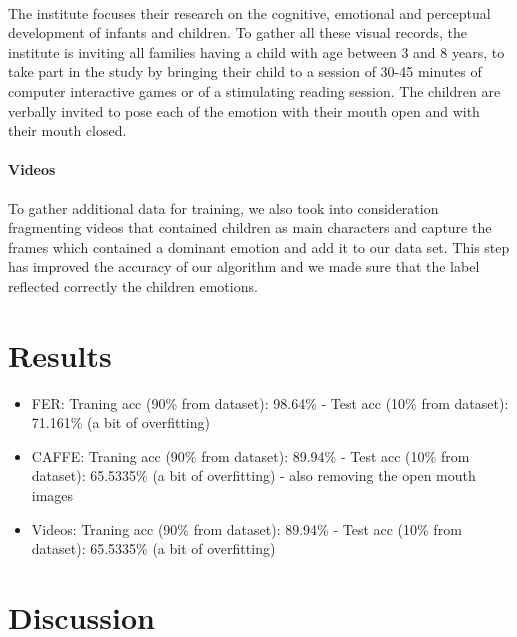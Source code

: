 \documentclass[runningheads,a4paper,11pt]{report}
\begin{document}
\paragraph{}
The institute focuses their research on the cognitive, emotional and perceptual development of infants and children. To gather all these visual records, the institute is inviting all families having a child with age between 3 and 8 years, to take part in the study by bringing their child to a session of 30-45 minutes of computer interactive games or of a stimulating reading session. The children are verbally invited to pose each of the emotion with their mouth open and with their mouth closed.

\paragraph{Videos}
To gather additional data for training, we also took into consideration fragmenting videos that contained children as main characters and capture the frames which contained a dominant emotion and add it to our data set. This step has improved the accuracy of our algorithm and we made sure that the label reflected correctly the children emotions.

\section{Results}
\label{section:results}


\begin{itemize}
  \item FER: Traning acc (90\% from dataset): 98.64\% - Test acc (10\% from dataset): 71.161\% (a bit of overfitting)
  \item CAFFE: Traning acc (90\% from dataset): 89.94\% - Test acc (10\% from dataset): 65.5335\% (a bit of overfitting) - also removing the open mouth images
  \item Videos: Traning acc (90\% from dataset): 89.94\% - Test acc (10\% from dataset): 65.5335\% (a bit of overfitting)
\end{itemize}

\section{Discussion}
\label{section:discussion}
\end{document}
